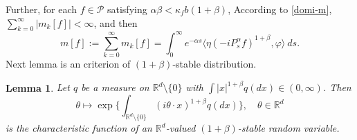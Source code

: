 \documentclass[12pt,a4paper]{amsart}
\theoremstyle{plain}
\newtheorem{lem}[thm]{Lemma}
\theoremstyle{definition}
\numberwithin{equation}{section}
\begin{document}
Further, for each $f\in \mathcal{P}$ satisfying $\alpha\beta<\kappa_fb(1+\beta)$,
According to \eqref{domi-m}, $\sum_{k=0}^\infty |m_k[f]|<\infty$, and  then
\begin{equation}\label{sum-m}
m[f]
    :=\sum_{k=0}^\infty m_k[f]
    =\int_0^{\infty} e^{-\alpha s} \langle \eta (-iP_s^\alpha f)^{1+\beta}, \varphi \rangle~ds.
\end{equation}
Next lemma is an criterion of $(1+\beta)$-stable distribution.
\begin{lem}
\label{lem: charactreisticfunction}
    Let $q$ be a measure on $\mathbb R^d\setminus\{0\}$ with $\int |x|^{1+\beta} q(dx) \in (0,\infty)$.
    Then $$\theta \mapsto  \exp\Big\{\int_{\mathbb R^d\setminus\{0\}} (i\theta \cdot x)^{1+\beta} q(dx)\Big\},\quad \theta \in \mathbb R^d$$
    is the characteristic function of an $\mathbb R^d$-valued $(1+\beta)$-stable random variable.
\end{lem}
\end{document}
